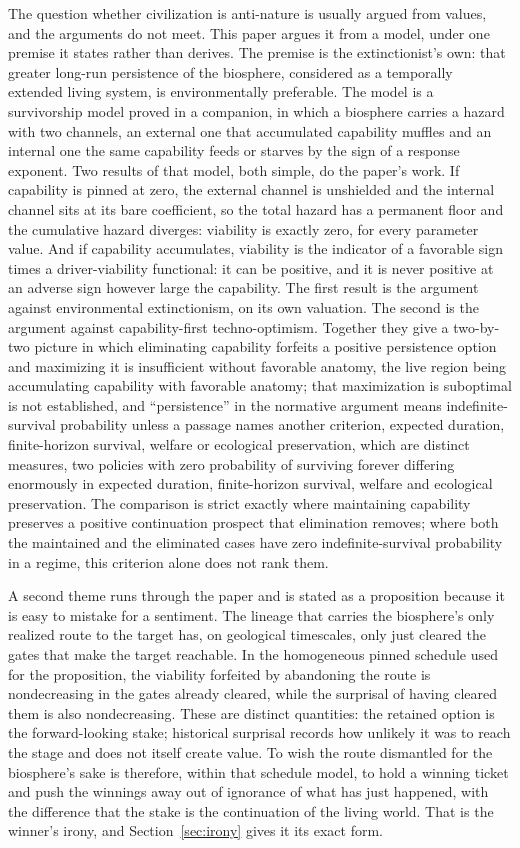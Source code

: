 The question whether civilization is anti-nature is usually argued from
values, and the arguments do not meet. This paper argues it from a
model, under one premise it states rather than derives. The premise is
the extinctionist's own: that greater long-run persistence of the
biosphere, considered as a temporally extended living system, is
environmentally preferable. The model is a survivorship model proved in
a companion, in which a biosphere carries a hazard with two channels, an
external one that accumulated capability muffles and an internal one the
same capability feeds or starves by the sign of a response exponent. Two
results of that model, both simple, do the paper's work. If capability
is pinned at zero, the external channel is unshielded and the internal
channel sits at its bare coefficient, so the total hazard has a
permanent floor and the cumulative hazard diverges: viability is
exactly zero, for every parameter value. And if capability accumulates,
viability is the indicator of a favorable sign times a driver-viability
functional: it can be positive, and it is never positive at an adverse
sign however large the capability. The first result is the argument
against environmental extinctionism, on its own valuation. The second
is the argument against capability-first techno-optimism. Together they give a two-by-two picture in which eliminating capability forfeits a positive persistence option and maximizing it is insufficient without favorable anatomy, the live region being accumulating capability with favorable anatomy; that maximization is suboptimal is not established, and ``persistence'' in the normative argument means indefinite-survival probability unless a passage names another criterion, expected duration, finite-horizon survival, welfare or ecological preservation, which are distinct measures, two policies with zero probability of surviving forever differing enormously in expected duration, finite-horizon survival, welfare and ecological preservation. The comparison is strict exactly where maintaining capability preserves a positive continuation prospect that elimination removes; where both the maintained and the eliminated cases have zero indefinite-survival probability in a regime, this criterion alone does not rank them.

A second theme runs through the paper and is stated as a proposition
because it is easy to mistake for a sentiment. The lineage that carries
the biosphere's only realized route to the target has, on geological
timescales, only just cleared the gates that make the target reachable.
In the homogeneous pinned schedule used for the proposition, the
viability forfeited by abandoning the route is nondecreasing in the
gates already cleared, while the surprisal of having cleared them is
also nondecreasing. These are distinct quantities: the retained option
is the forward-looking stake; historical surprisal records how unlikely
it was to reach the stage and does not itself create value. To wish the
route dismantled for the biosphere's sake is therefore, within that
schedule model, to hold a winning ticket and push the winnings away out
of ignorance of what has just happened, with the difference that the
stake is the continuation of the living world. That is the winner's
irony, and Section~\ref{sec:irony} gives it its exact form.

